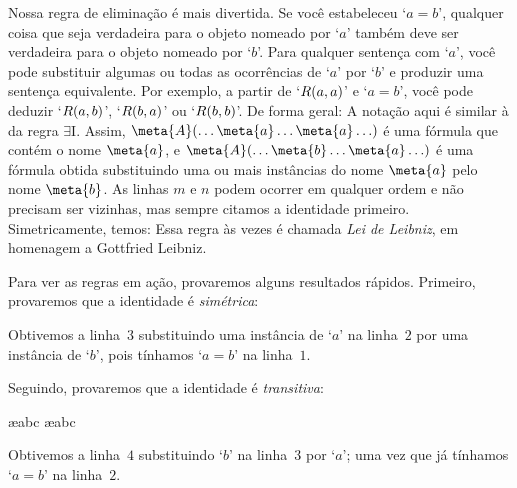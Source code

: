 Nossa regra de eliminação é mais divertida. Se você estabeleceu `$a=b$',  qualquer coisa que seja verdadeira para o objeto nomeado por `$a$' também deve ser verdadeira para o objeto nomeado por `$b$'. Para qualquer sentença com `$a$', você pode substituir algumas ou todas as ocorrências de `$a$' por `$b$' e produzir uma sentença equivalente. Por exemplo,  a partir de `$\mathord{R}(a,a)$' e `$a = b$',  você pode deduzir `$\mathord{R}(a,b)$', `$\mathord{R}(b,a)$' ou `$\mathord{R}(b,b)$'. De forma geral:
A notação aqui é similar à da regra $\exists$I. Assim, $\meta{A}(\ldots \meta{a} \ldots \meta{a}\ldots)$ é uma fórmula que contém o nome $\meta{a}$, e $\meta{A}(\ldots \meta{b} \ldots \meta{a}\ldots)$ é uma fórmula obtida substituindo uma ou mais instâncias do nome $\meta{a}$ pelo nome $\meta{b}$. As linhas $m$ e $n$ podem ocorrer em qualquer ordem e não precisam ser vizinhas, mas sempre citamos a identidade primeiro. Simetricamente, temos:
Essa regra às vezes é chamada  \emph{Lei de Leibniz}, em homenagem a Gottfried Leibniz. 

Para ver as regras em ação, provaremos alguns resultados rápidos. Primeiro, provaremos que a identidade é  \emph{simétrica}:
 
\begin{fitchproof}
	\open
	\close
\end{fitchproof}
Obtivemos a linha~$3$ substituindo uma instância de `$a$' na linha~$2$ por uma instância de `$b$', pois tínhamos `$a= b$' na linha~$1$.

Seguindo, provaremos que a identidade é  \emph{transitiva}:
\begin{fitchproof}
	\open
		\ae{abc}
		\ae{abc}
	\close
\end{fitchproof}
Obtivemos a linha~$4$ substituindo `$b$' na linha~$3$ por `$a$'; uma vez que já tínhamos `$a= b$' na linha~$2$.

